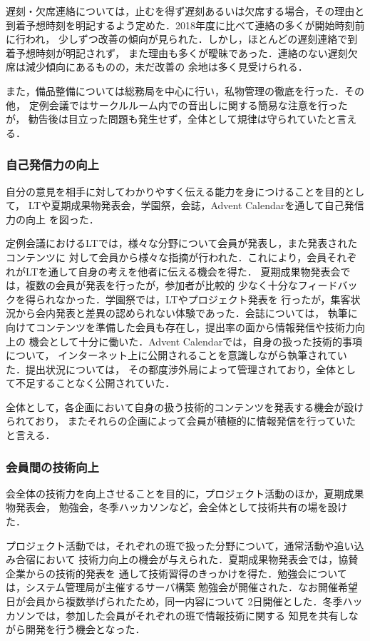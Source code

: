 遅刻・欠席連絡については，止むを得ず遅刻あるいは欠席する場合，その理由と
到着予想時刻を明記するよう定めた．2018年度に比べて連絡の多くが開始時刻前に行われ，
少しずつ改善の傾向が見られた．しかし，ほとんどの遅刻連絡で到着予想時刻が明記されず，
また理由も多くが曖昧であった．連絡のない遅刻欠席は減少傾向にあるものの，未だ改善の
余地は多く見受けられる．

また，備品整備については総務局を中心に行い，私物管理の徹底を行った．その他，
定例会議ではサークルルーム内での音出しに関する簡易な注意を行ったが，
勧告後は目立った問題も発生せず，全体として規律は守られていたと言える．

\subsubsection*{自己発信力の向上}
自分の意見を相手に対してわかりやすく伝える能力を身につけることを目的として，
LTや夏期成果物発表会，学園祭，会誌，Advent Calendarを通して自己発信力の向上
を図った．

定例会議におけるLTでは，様々な分野について会員が発表し，また発表されたコンテンツに
対して会員から様々な指摘が行われた．これにより，会員それぞれがLTを通して自身の考えを他者に伝える機会を得た．
夏期成果物発表会では，複数の会員が発表を行ったが，参加者が比較的
少なく十分なフィードバックを得られなかった．学園祭では，LTやプロジェクト発表を
行ったが，集客状況から会内発表と差異の認められない体験であった．会誌については，
執筆に向けてコンテンツを準備した会員も存在し，提出率の面から情報発信や技術力向上の
機会として十分に働いた．Advent Calendarでは，自身の扱った技術的事項について，
インターネット上に公開されることを意識しながら執筆されていた．提出状況については，
その都度渉外局によって管理されており，全体として不足することなく公開されていた．

全体として，各企画において自身の扱う技術的コンテンツを発表する機会が設けられており，
またそれらの企画によって会員が積極的に情報発信を行っていたと言える．

\subsubsection*{会員間の技術向上}
会全体の技術力を向上させることを目的に，プロジェクト活動のほか，夏期成果物発表会，
勉強会，冬季ハッカソンなど，会全体として技術共有の場を設けた．

プロジェクト活動では，それぞれの班で扱った分野について，通常活動や追い込み合宿において
技術力向上の機会が与えられた．夏期成果物発表会では，協賛企業からの技術的発表を
通して技術習得のきっかけを得た．勉強会については，システム管理局が主催するサーバ構築
勉強会が開催された．なお開催希望日が会員から複数挙げられたため，同一内容について
2日開催とした．冬季ハッカソンでは，参加した会員がそれぞれの班で情報技術に関する
知見を共有しながら開発を行う機会となった．

